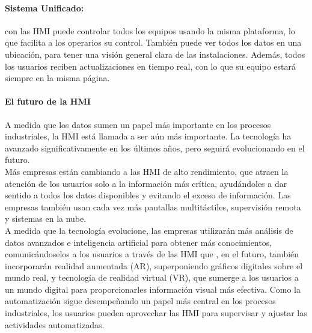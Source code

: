 \documentclass[12pt,titlepage]{article}
\begin{document}
\paragraph*{Sistema Unificado:} con las HMI puede controlar todos los equipos usando la misma plataforma, lo que facilita a los operarios su control. También puede ver todos los datos en una ubicación, para tener una visión general clara de las instalaciones. Además, todos los usuarios reciben actualizaciones en tiempo real, con lo que su equipo estará siempre en la misma página. 

\paragraph{El futuro de la HMI}\leavevmode\newline
A medida que los datos sumen un papel más importante en los procesos industriales, la HMI está llamada a ser aún más importante. La tecnología ha avanzado significativamente en los últimos años, pero seguirá evolucionando en el futuro. \\

Más empresas están cambiando a las HMI de alto rendimiento, que atraen la atención de los usuarios solo a la información más crítica, ayudándoles a dar sentido a todos los datos disponibles y evitando el exceso de información. Las empresas también usan cada vez más pantallas multitáctiles, supervisión remota y sistemas en la nube. \\

A medida que la tecnología evolucione, las empresas utilizarán más análisis de datos avanzados e inteligencia artificial para obtener más conocimientos, comunicándoselos a los usuarios a través de las HMI que , en el futuro, también incorporarán realidad aumentada (AR), superponiendo gráficos digitales sobre el mundo real, y tecnología de realidad virtual (VR), que sumerge a los usuarios a un mundo digital para proporcionarles información visual más efectiva. Como la automatización sigue desempeñando un papel más central en los procesos industriales, los usuarios pueden aprovechar las HMI para supervisar y ajustar las actividades automatizadas. 
\end{document}

